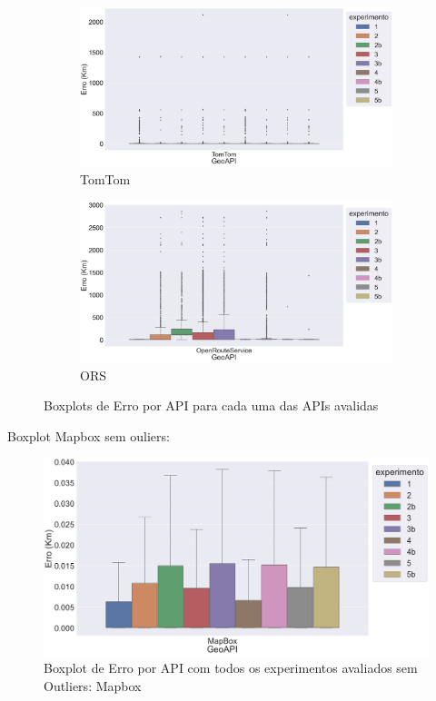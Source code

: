 \begin{figure}[ht]
  \begin{subfigure}[b]{0.45\textwidth}
    \includegraphics[width=\textwidth]{Figuras/boxplotApiTomtom.png}
    \caption{TomTom}
    \label{fig:boxplot-api-tomtom}
  \end{subfigure}
  \hfill
  \begin{subfigure}[b]{0.45\textwidth}
    \includegraphics[width=\textwidth]{Figuras/boxplotApiOrs.png}
    \caption{ORS}
    \label{fig:boxplot-api-ors}
  \end{subfigure}
  
  \caption{Boxplots de Erro por API para cada uma das APIs avalidas}
  \label{fig:boxplot-api-global-bh}
\end{figure}

Boxplot Mapbox sem ouliers:

\begin{figure}[h]
    \centering
    \includegraphics[width=\textwidth]{Figuras/boxplotApiMapboxSemOut.png}
    \caption{Boxplot de Erro por API com todos os experimentos avaliados sem Outliers: Mapbox}
    \label{fig:boxplot-api-mapbox-semout}
\end{figure}

